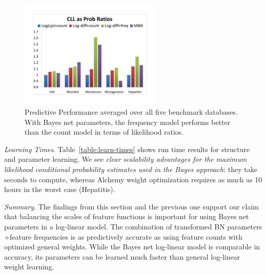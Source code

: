 \documentclass[runningheads,a4paper]{llncs}
\newcommand{\fixneeded}[1]{\textbf{[\footnotesize #1]}}
\newcommand{\point}[1]{\noindent\emph{#1}.}
\newcommand{\keypoint}[1]{{\em #1}}
\begin{document}
\begin{figure}[htbp]

\begin{center}
\includegraphics[width=0.6\textwidth]{CLL_Prob_Ratios_New}
\caption{Predictive Performance averaged over all five benchmark databases. With Bayes net parameters, the frequency model performs better than the count model in terms of likelihood ratios. 
}
\label{fig:summarize}
\end{center}
\end{figure}

\point{Learning Times}
Table~\ref{table:learn-times} shows run time results for structure and parameter learning. We see \keypoint{clear scalability advantages for the maximum likelihood conditional probability estimates used in the Bayes approach}: they take seconds to compute, whereas Alchemy weight optimization requires as much as 10 hours in the worst case (Hepatitis). 



\point{Summary} 
The findings from this section and the previous one support our claim that balancing the scales of feature functions is important for using Bayes net parameters in a log-linear model. The combination of  transformed BN parameters +feature frequencies  is as predictively accurate as using feature counts with optimized general weights.
While the Bayes net log-linear model is comparable in accuracy, its parameters can be learned much faster than general log-linear weight learning.
%

 
 
\end{document}
